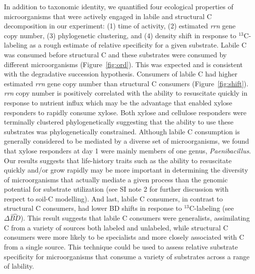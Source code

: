 In addition to taxonomic identity, we quantified four ecological properties of
microorganisms that were actively engaged in labile and structural C
decomposition in our experiment: (1) time of activity, (2) estimated
\textit{rrn} gene copy number, (3) phylogenetic clustering, and (4) density
shift in response to $^{13}$C-labeling as a rough estimate of relative
specificity for a given substrate. Labile C was consumed before structural C and 
these substrates were consumed by different microorganisms
(Figure~\ref{fig:ord}). This was expected and is consistent with the
degradative succession hypothesis. Consumers of
labile C had higher estimated \textit{rrn}
gene copy number than structural C consumers (Figure~\ref{fig:shift}).  \textit{rrn} copy number is
positively correlated with the ability to resuscitate quickly in response to
nutrient influx \citep{Klappenbach_2000} which may be the advantage that
enabled xylose responders to rapidly consume xylose. Both xylose and cellulose
responders were terminally clustered phylogenetically suggesting that the ability
to use these substrates was phylogenetically constrained. Although labile C
consumption is generally considered to be mediated by a diverse set of 
microorganisms, we found that xylose responders at day 1 were mainly members of
one genus, \textit{Paenibacillus}. Our results suggests that life-history
traits such as the ability to resuscitate
quickly and/or grow rapidly may be more important in determining the
diversity of microorganisms that actually mediate a given process than the genomic
potential for substrate utilization (see SI note 2 for further discussion with respect to
soil-C modelling). And last, labile C consumers, in contrast to structural C consumers, 
had lower BD shifts in response to $^{13}$C-labeling (see $\Delta\hat{BD}$).
This result suggests that labile C consumers were generalists, assimilating C
from a variety of sources both labeled and unlabeled, while structural C
consumers were more likely to be specialists and more closely associated
with C from a single source. This technique could be used to assess relative
substrate specificity for microorganisms that consume a variety of substrates
across a range of lability.

